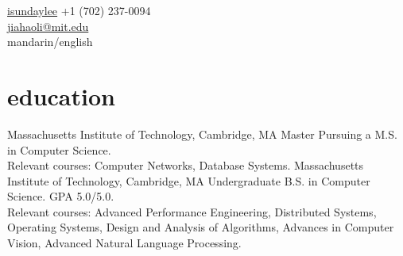 \documentclass[]{friggeri-cv} %
\begin{document}
{\faGithub \hspace{0.1em} \href{https://github.com/isundaylee}{isundaylee}}
{+1 (702) 237-0094\\
\href{mailto:jiahaoli@mit.edu}{jiahaoli@mit.edu}\\
mandarin/english} %




\section{education}

\begin{entrylist}
  {Massachusetts Institute of Technology, Cambridge, MA}
  {Master}
  {Pursuing a M.S. in Computer Science. \\
  Relevant courses: Computer Networks, Database Systems.}
  {Massachusetts Institute of Technology, Cambridge, MA}
  {Undergraduate}
  {B.S. in Computer Science. GPA 5.0/5.0. \\
  Relevant courses: Advanced Performance Engineering, Distributed Systems, Operating Systems, Design and Analysis of Algorithms, Advances in Computer Vision, Advanced Natural Language Processing.}
\end{entrylist}
\end{document}
